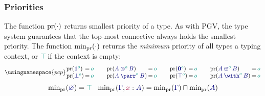 \subsubsection*{Priorities}
\label{sec:pcp-priorities}
The function $\operatorname{pr}(\cdot)$ returns smallest priority of a type. As with PGV, the type system guarantees that the top-most connective always holds the smallest priority.  The function $\text{min}_{\operatorname{pr}}(\cdot)$ returns the \emph{minimum} priority of all types a typing context, or $\cs{\ptop}$ if the context is empty:
\[
  \usingnamespace{pcp}
  \setlength{\arraycolsep}{1pt}
  \begin{array}{lclclcl}
    \pr(\ty{\tyone[\cs{o}]})        & = & \cs{o} \\
    \pr(\ty{\tybot[\cs{o}]})        & = & \cs{o}
  \end{array}
  \qquad
  \begin{array}{lclclcl}
    \pr(\ty{\tytens[\cs{o}]{A}{B}}) & = & \cs{o} \\
    \pr(\ty{\typarr[\cs{o}]{A}{B}}) & = & \cs{o}
  \end{array}
  \qquad
  \begin{array}{lclclcl}
    \pr(\ty{\tynil[\cs{o}]})        & = & \cs{o} \\
    \pr(\ty{\tytop[\cs{o}]})        & = & \cs{o}
  \end{array}
  \qquad
  \begin{array}{lclclcl}
    \pr(\ty{\typlus[\cs{o}]{A}{B}}) & = & \cs{o} \\
    \pr(\ty{\tywith[\cs{o}]{A}{B}}) & = & \cs{o}
  \end{array}
\]
\[
  \minpr(\ty{\emptyenv})          = \cs{\ptop}
  \quad
  \minpr(\ty{\Gamma},\tmty{x}{A}) = \minpr(\ty{\Gamma})\sqcap\minpr(\ty{A})
\]

